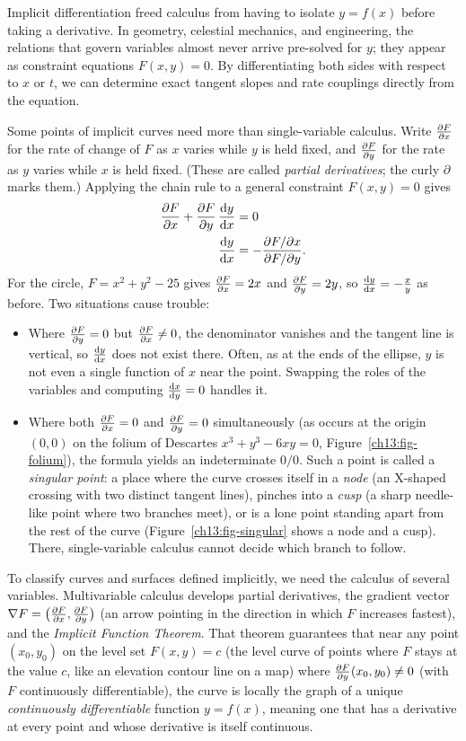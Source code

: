 \begin{connectionbox}
Implicit differentiation freed calculus from having to isolate $y = f(x)$ before taking a derivative. In geometry, celestial mechanics, and engineering, the relations that govern variables almost never arrive pre-solved for $y$; they appear as constraint equations $F(x,y) = 0$. By differentiating both sides with respect to $x$ or $t$, we can determine exact tangent slopes and rate couplings directly from the equation.

Some points of implicit curves need more than single-variable calculus. Write $\frac{\partial F}{\partial x}$ for the rate of change of $F$ as $x$ varies while $y$ is held fixed, and $\frac{\partial F}{\partial y}$ for the rate as $y$ varies while $x$ is held fixed. (These are called \emph{partial derivatives}; the curly $\partial$ marks them.) Applying the chain rule to a general constraint $F(x,y) = 0$ gives
\begin{align*}
  \frac{\partial F}{\partial x} + \frac{\partial F}{\partial y}\,\frac{\mathrm{d} y}{\mathrm{d} x} &= 0 \\
  \frac{\mathrm{d} y}{\mathrm{d} x} &= -\frac{\partial F/\partial x}{\partial F/\partial y}.
\end{align*}
For the circle, $F = x^2+y^2-25$ gives $\frac{\partial F}{\partial x}=2x$ and $\frac{\partial F}{\partial y}=2y$, so $\frac{\mathrm{d} y}{\mathrm{d} x} = -\tfrac{x}{y}$ as before. Two situations cause trouble:
\begin{itemize}
  \item Where $\frac{\partial F}{\partial y} = 0$ but $\frac{\partial F}{\partial x} \ne 0$, the denominator vanishes and the tangent line is vertical, so $\frac{\mathrm{d} y}{\mathrm{d} x}$ does not exist there. Often, as at the ends of the ellipse, $y$ is not even a single function of $x$ near the point. Swapping the roles of the variables and computing $\frac{\mathrm{d} x}{\mathrm{d} y} = 0$ handles it.
  \item Where both $\frac{\partial F}{\partial x} = 0$ and $\frac{\partial F}{\partial y} = 0$ simultaneously (as occurs at the origin $(0,0)$ on the folium of Descartes $x^3+y^3-6xy=0$, Figure~\ref{ch13:fig-folium}), the formula yields an indeterminate $0/0$. Such a point is called a \emph{singular point}: a place where the curve crosses itself in a \emph{node} (an X-shaped crossing with two distinct tangent lines), pinches into a \emph{cusp} (a sharp needle-like point where two branches meet), or is a lone point standing apart from the rest of the curve (Figure~\ref{ch13:fig-singular} shows a node and a cusp). There, single-variable calculus cannot decide which branch to follow.
\end{itemize}

To classify curves and surfaces defined implicitly, we need the calculus of several variables. Multivariable calculus develops partial derivatives, the gradient vector $\nabla F = \big(\frac{\partial F}{\partial x}, \frac{\partial F}{\partial y}\big)$ (an arrow pointing in the direction in which $F$ increases fastest), and the \emph{Implicit Function Theorem}. That theorem guarantees that near any point $(x_0, y_0)$ on the level set $F(x,y)=c$ (the level curve of points where $F$ stays at the value $c$, like an elevation contour line on a map) where $\frac{\partial F}{\partial y}(x_0, y_0) \ne 0$ (with $F$ continuously differentiable), the curve is locally the graph of a unique \emph{continuously differentiable} function $y = f(x)$, meaning one that has a derivative at every point and whose derivative is itself continuous.
\end{connectionbox}

